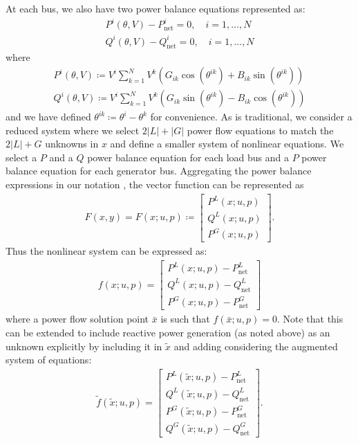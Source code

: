 At each bus, we also have two power balance equations represented as:
\begin{subequations}
\begin{align}
P^i(\theta, V) - P_{\text{net}}^i = 0 ,\quad i = 1,\ldots,N \\
Q^i(\theta, V) - Q_{\text{net}}^i = 0 ,\quad i = 1,\ldots,N
\end{align}
\end{subequations}
where
\begin{subequations}
\begin{align}
P^i(\theta, V) \coloneqq V^i \sum_{k=1}^N V^k \left( G_{ik} \cos(\theta^{ik}) + B_{ik}\sin(\theta^{ik}) \right) \\
Q^i(\theta, V) \coloneqq V^i \sum_{k=1}^N V^k \left( G_{ik} \sin(\theta^{ik}) - B_{ik}\cos(\theta^{ik}) \right) 
\end{align}
\end{subequations}
and we have defined $\theta^{ik} \coloneqq \theta^i - \theta^k$ for convenience.
As is traditional, we consider a reduced system where we select $2|L| + |G|$ power flow equations to match the $2|L| + G$ unknowns in $x$ and define a smaller system of nonlinear equations.
We select a $P$ and a $Q$ power balance equation for each load bus and a $P$ power balance equation for each generator bus.
Aggregating the power balance expressions in our notation \cite{Dommel1968}, the vector function can be represented as
\begin{align}
F(x,y) = F(x; u, p) \coloneqq
\begin{bmatrix}
P^L(x; u, p) \\ Q^L(x; u, p) \\ P^G(x; u, p)
\end{bmatrix}.
\end{align}
Thus the nonlinear system can be expressed as:
\begin{align}
f(x; u, p) =
\begin{bmatrix}
P^L(x; u, p) - P^L_{\text{net}} \\
Q^L(x; u, p) - Q^L_{\text{net}} \\
P^G(x; u, p) - P^G_{\text{net}}
\end{bmatrix}
\end{align}
where a power flow solution point $\bar{x}$ is such that $f(\bar{x}; u, p) = 0$.
Note that this can be extended to include reactive power generation (as noted above) as an unknown explicitly by including it in $\tilde{x}$ and adding considering the augmented system of equations:
\begin{align}
\tilde{f}(\tilde{x}; u, p) =
\begin{bmatrix}
P^L(\tilde{x}; u, p) - P^L_{\text{net}} \\
Q^L(\tilde{x}; u, p) - Q^L_{\text{net}} \\
P^G(\tilde{x}; u, p) - P^G_{\text{net}} \\
Q^G(\tilde{x}; u, p) - Q^G_{\text{net}}
\end{bmatrix}.
\end{align}
